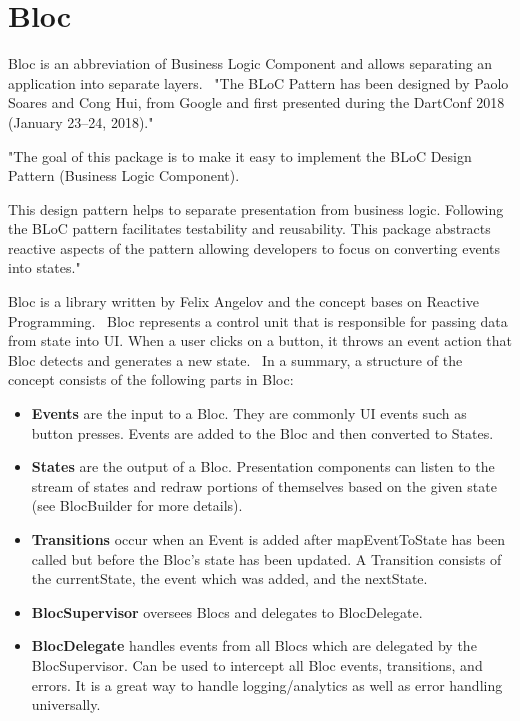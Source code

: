 \section{Bloc}\label{sec:bloc}
Bloc is an abbreviation of Business Logic Component and allows separating an application into separate layers.~\cite{bloc}
"The BLoC Pattern has been designed by Paolo Soares and Cong Hui, from Google and first presented during the DartConf 2018 (January 23--24, 2018)."~\cite{didierboelens}

"The goal of this package is to make it easy to implement the BLoC Design Pattern (Business Logic Component).

This design pattern helps to separate presentation from business logic.
Following the BLoC pattern facilitates testability and reusability.
This package abstracts reactive aspects of the pattern allowing developers to focus on converting events into states."~\cite{bloc}

Bloc is a library written by Felix Angelov and the concept bases on Reactive Programming.~\cite{bloc}
Bloc represents a control unit that is responsible for passing data from state into UI.
When a user clicks on a button, it throws an event action that Bloc detects and generates a new state.~\cite{bloc}
In a summary, a structure of the concept consists of the following parts in Bloc:
\begin{itemize}
    \item \textbf{Events} are the input to a Bloc.
    They are commonly UI events such as button presses.
    Events are added to the Bloc and then converted to States.
    \item \textbf{States} are the output of a Bloc.
    Presentation components can listen to the stream of states and redraw portions of themselves based on the given state (see BlocBuilder for more details).
    \item \textbf{Transitions} occur when an Event is added after mapEventToState has been called but before the Bloc's state has been updated.
    A Transition consists of the currentState, the event which was added, and the nextState.
    \item \textbf{BlocSupervisor} oversees Blocs and delegates to BlocDelegate.
    \item \textbf{BlocDelegate} handles events from all Blocs which are delegated by the BlocSupervisor.
    Can be used to intercept all Bloc events, transitions, and errors.
    It is a great way to handle logging/analytics as well as error handling universally.
\end{itemize}

